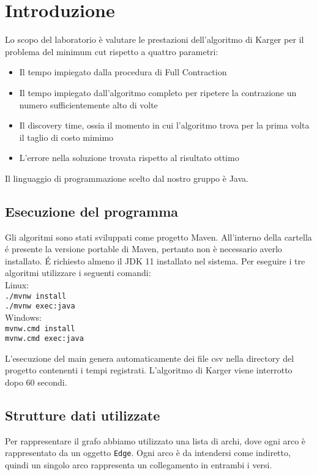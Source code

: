 \section{Introduzione}
Lo scopo del laboratorio è valutare le prestazioni dell'algoritmo di Karger per il problema del minimum cut rispetto a quattro parametri:
\begin{itemize}
    \item Il tempo impiegato dalla procedura di Full Contraction
    \item Il tempo impiegato dall'algoritmo completo per ripetere la contrazione un numero sufficientemente alto di volte
    \item Il discovery time, ossia il momento in cui l'algoritmo trova per la prima volta il taglio di costo mimimo
    \item L'errore nella soluzione trovata rispetto al risultato ottimo
\end{itemize}
Il linguaggio di programmazione scelto dal nostro gruppo è Java.

\subsection{Esecuzione del programma}
Gli algoritmi sono stati sviluppati come progetto Maven. All'interno della cartella \'e presente la versione portable di Maven, pertanto non è necessario averlo installato. \'E
richiesto almeno il JDK 11 installato nel sistema.
Per eseguire i tre algoritmi utilizzare i seguenti comandi:\\
Linux:\\
\indent \texttt{./mvnw install}\\
\indent \texttt{./mvnw exec:java}\\
Windows:\\
\indent \texttt{mvnw.cmd install}\\
\indent \texttt{mvnw.cmd exec:java}

L'esecuzione del main genera automaticamente dei file csv nella directory del progetto contenenti i tempi registrati.
L'algoritmo di Karger viene interrotto dopo 60 secondi.
\subsection{Strutture dati utilizzate}

Per rappresentare il grafo abbiamo utilizzato una lista di archi, dove ogni arco è rappresentato da un oggetto \texttt{Edge}.
Ogni arco è da intendersi come indiretto, quindi un singolo arco rappresenta un collegamento in
entrambi i versi.

